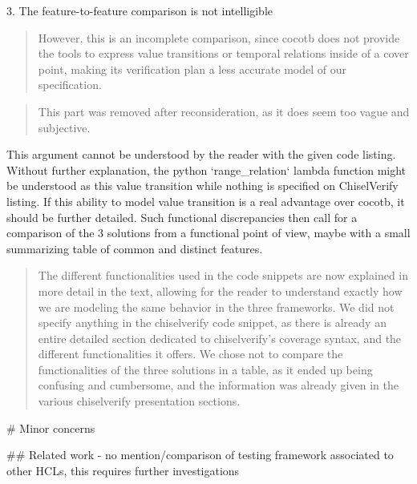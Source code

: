 \documentclass{article}
\newcommand{\todo}[1]{{\color{olive} TODO: #1}}
\newcommand{\martin}[1]{{\color{blue} Martin: #1\\}}
\newcommand{\reply}[1]{{\color{blue} #1}}
\begin{document}

3. The feature-to-feature comparison is not intelligible 
\begin{quote}
However, this is
an incomplete comparison, since cocotb does not provide the
tools to express value transitions or temporal relations inside
of a cover point, making its verification plan a less accurate
model of our specification. 
\end{quote}

\begin{quote}
\reply{This part was removed after reconsideration, as it does seem too vague and subjective.}
\end{quote}

This argument cannot be understood by the reader with the given code listing.
Without further explanation, the python `range\_relation` lambda function might be understood as this value transition while nothing is specified on ChiselVerify listing.
If this ability to model value transition is a real advantage over cocotb, it should be further detailed.
Such functional discrepancies then call for a comparison of the 3 solutions from a functional point of view, maybe with a small summarizing table of common and distinct features.

\begin{quote}
\reply{The different functionalities used in the code snippets are now explained in more detail in the text, allowing for the reader to understand exactly how we are modeling the same behavior in the three frameworks.
We did not specify anything in the chiselverify code snippet, as there is already an entire detailed section dedicated to chiselverify's coverage syntax, and the different functionalities it offers.
We chose not to compare the functionalities of the three solutions in a table, as it ended up being confusing and cumbersome, and the information was already given in the various chiselverify presentation sections.}
\end{quote}

\# Minor concerns

\#\# Related work
- no mention/comparison of testing framework associated to other HCLs, this requires further investigations

\end{document}
